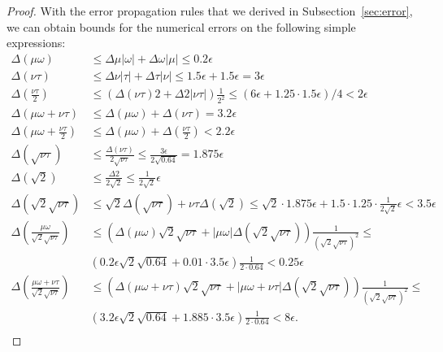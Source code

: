 \documentclass{article}
\renewcommand{\leq}{\leqslant}
\begin{document}
\begin{proof}
With the error propagation rules that we derived in Subsection~\ref{sec:error}, we 
can obtain bounds for the numerical errors on the following simple expressions:
\begin{align}
  \Delta \left( \mu \omega \right) &\leq \Delta \mu \left| \omega \right| +  \Delta \omega \left| \mu \right| \leq 0.2 \epsilon \\ \nonumber
  \Delta \left( \nu \tau \right) &\leq \Delta \nu \left| \tau \right| +  \Delta \tau \left| \nu \right| \leq 1.5 \epsilon + 1.5 \epsilon = 3 \epsilon \\ \nonumber
  \Delta \left( \frac{\nu \tau}{2} \right) &\leq \left( \Delta (\nu \tau) 2 +  \Delta 2 \left| \nu \tau \right| \right) \frac{1}{2^2} \leq (6\epsilon + 1.25 \cdot 1.5 \epsilon )/4 < 2 \epsilon \\ \nonumber
  \Delta \left(\mu \omega + \nu \tau \right) &\leq \Delta \left( \mu \omega \right) + \Delta \left( \nu \tau \right) = 3.2 \epsilon \\ \nonumber
  \Delta \left(\mu \omega + \frac{\nu \tau}{2} \right) &\leq \Delta \left( \mu \omega \right) + \Delta \left( \frac{\nu \tau}{2} \right) < 2.2 \epsilon \\ \nonumber
  \Delta \left(\sqrt{\nu \tau} \right) &\leq \frac{\Delta \left( \nu \tau \right)}{2 \sqrt{\nu \tau}} \leq \frac{3 \epsilon}{2 \sqrt{0.64}} = 1.875 \epsilon  \\ \nonumber
  \Delta \left(\sqrt{2}\right) &\leq \frac{\Delta 2}{2 \sqrt{2}} \leq \frac{1}{2\sqrt{2}} \epsilon  \\ \nonumber
  \Delta \left(\sqrt{2}  \sqrt{\nu \tau}\right) &\leq \sqrt{2}  \Delta \left(\sqrt{\nu \tau}\right) + \nu \tau  \Delta \left( \sqrt{2} \right) \leq 
        \sqrt{2} \cdot 1.875 \epsilon  + 1.5 \cdot 1.25 \cdot \frac{1}{2\sqrt{2}} \epsilon < 3.5 \epsilon  \\ \nonumber
  \Delta \left(\frac{\mu \omega }{\sqrt{2}\sqrt{\nu \tau}}\right) &\leq  
         \left( \Delta \left(\mu \omega\right)  \sqrt{2}\sqrt{\nu \tau} +  \left| \mu \omega \right|  \Delta \left(\sqrt{2}\sqrt{\nu \tau} \right) \right) \frac{1}{\left(\sqrt{2}\sqrt{\nu \tau}\right)^2} \leq \\ \nonumber
         & \left( 0.2 \epsilon  \sqrt{2}\sqrt{0.64} +  0.01 \cdot 3.5 \epsilon \right) \frac{1}{2\cdot 0.64} < 0.25 \epsilon \\ \nonumber
 \Delta \left(\frac{\mu \omega + \nu \tau}{\sqrt{2}\sqrt{\nu \tau}}\right) &\leq  
        \left( \Delta \left(\mu \omega + \nu \tau \right)  \sqrt{2}\sqrt{\nu \tau} +  \left| \mu \omega + \nu \tau \right|  \Delta \left(\sqrt{2}\sqrt{\nu \tau} \right) \right) \frac{1}{\left(\sqrt{2}\sqrt{\nu \tau}\right)^2} \leq \\ \nonumber
         & \left( 3.2 \epsilon  \sqrt{2}\sqrt{0.64} +  1.885\cdot 3.5 \epsilon \right) \frac{1}{2\cdot 0.64} < 8  \epsilon . \\ \nonumber
\end{align}


\end{proof}
\end{document}

